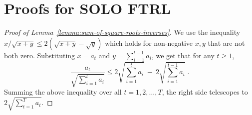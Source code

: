 \section{Proofs for \textsc{SOLO FTRL}}
\label{section:solo-ftrl-proofs}

\begin{proof}[Proof of Lemma~\ref{lemma:sum-of-square-roots-inverses}]
We use the inequality $x/\sqrt{x+y} \le 2(\sqrt{x+y} - \sqrt{y})$ which holds
for non-negative $x,y$ that are not both zero. Substituting $x = a_t$ and $y=\sum_{i=1}^{t-1} a_i$,
we get that for any $t \ge 1$,
$$
\frac{a_t}{\sqrt{\sum_{i=1}^t a_i}} \le 2 \sqrt{\sum_{i=1}^t a_i} \ - \ 2 \sqrt{\sum_{i=1}^{t-1} a_i} \; .
$$
Summing the above inequality over all $t=1,2,\dots,T$, the right side telescopes to
$2 \sqrt{\sum_{t=1}^T a_t}$.
\end{proof}